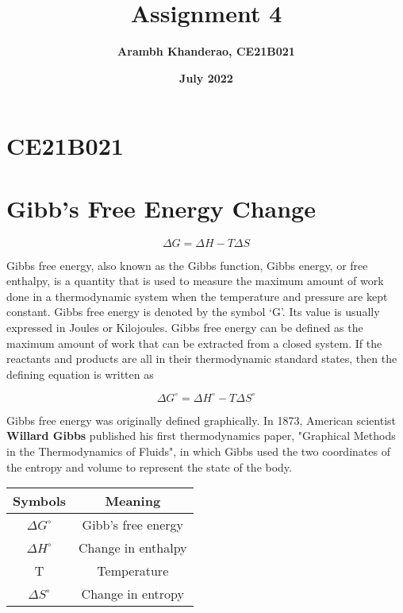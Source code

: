 \section{CE21B021}

\title{\textbf{Assignment 4}} 
\author{\textbf{Arambh Khanderao, CE21B021 }} 
\date{\textbf{July 2022}} 
\maketitle 

\section*{Gibb's Free Energy Change} 

\begin{equation}
\Delta G = \Delta H - T\Delta S 
\end{equation}

Gibbs free energy, also known as the Gibbs function, Gibbs energy, or free enthalpy, is a 
quantity that is used to measure the maximum amount of work done in a thermodynamic system when the temperature and pressure are kept 
constant. Gibbs free energy is denoted by the symbol ‘G’. Its value is usually expressed in Joules or Kilojoules. Gibbs free energy can be 
defined as the maximum amount of work that can be extracted from a closed system. If the reactants and products are all in their 
thermodynamic standard states, then the defining equation is written as 

\begin{equation}
\Delta G^\circ = \Delta H^\circ - T\Delta S^\circ 
\end{equation} 

Gibbs free energy was originally defined graphically. In 1873, American 
scientist \textbf{Willard Gibbs} published his first thermodynamics paper, "Graphical Methods in the Thermodynamics of Fluids", in which 
Gibbs used the two coordinates of the entropy and volume to represent the state of the body. 

\begin{center} 
\begin{tabular}{|c|c|}

\hline \textbf{Symbols} & \textbf{Meaning} \\ 
\hline $\Delta G^\circ$ & Gibb's free energy \\ 
\hline $\Delta H^\circ$ & Change in  enthalpy \\ 
\hline T & Temperature \\ 
\hline $\Delta S^\circ$ & Change in entropy \\ 
\hline
    
\end{tabular} 
\end{center} 
